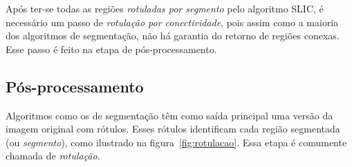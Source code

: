 \vspace{1.0cm}

Após ter-se todas as regiões \textit{rotuladas por segmento} pelo
algoritmo SLIC, é necessário um passo de \textit{rotulação por
conectividade}, pois assim como a maioria dos algoritmos de
segmentação, não há garantia do retorno de regiões conexas. Esse
passo é feito na etapa de pós-processamento.

\subsection{Pós-processamento}
\label{sec:posproc}

Algoritmos como os de segmentação têm como saída principal uma versão
da imagem original com rótulos. Esses rótulos identificam cada região
segmentada (ou \textit{segmento}), como ilustrado na
figura~\ref{fig:rotulacao}. Essa etapa é comumente chamada
de \emph{rotulação}.

